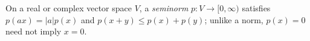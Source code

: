 
On a real or complex vector space $V$, a \emph{seminorm} $p:V\to[0,\infty)$ satisfies $p(ax)=|a|p(x)$ and $p(x+y)\le p(x)+p(y)$; unlike a norm, $p(x)=0$ need not imply $x=0$.
